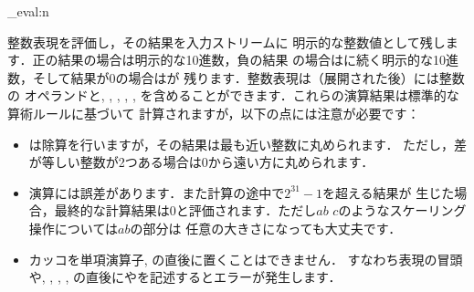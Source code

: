 \documentclass[uplatex,dvipdfmx,full,kernel]{wtpl3doc}
\begin{document}
\begin{documentation}
\begin{function}[EXP]{\int_eval:n}
  \begin{syntax}
     
  \end{syntax}
  整数表現を評価し，その結果を入力ストリームに
  明示的な整数値として残します．正の結果の場合は明示的な10進数，負の結果
  の場合は\code{-}に続く明示的な10進数，そして結果が0の場合はが
  残ります．整数表現は（展開された後）には整数の
  オペランドと\code{+}, \code{-}, \code{*}, \code{/}, \code{(}, \code{)}%
  を含めることができます．これらの演算結果は標準的な算術ルールに基づいて
  計算されますが，以下の点には注意が必要です：
%
  \begin{itemize}
  \item \code{/}は除算を行いますが，その結果は最も近い整数に丸められます．
    ただし，差が等しい整数が2つある場合は0から遠い方に丸められます．
%
  \item 演算には誤差があります．また計算の途中で$2^{31}-1$を超える結果が
    生じた場合，最終的な計算結果は0と評価されます．ただし$a$\code{*}$b$%
    \code{/}$c$のようなスケーリング操作については$a$\code{*}$b$の部分は
    任意の大きさになっても大丈夫です．
%
  \item カッコを単項演算子\code{+}, \code{-}の直後に置くことはできません．
    すなわち表現の冒頭や\code{+}, \code{-}, \code{*}, \code{/}, \code{(}%
    の直後に\code{+(}や\code{-(}を記述するとエラーが発生します．
  \end{itemize}


\end{function}
\end{documentation}
\end{document}
